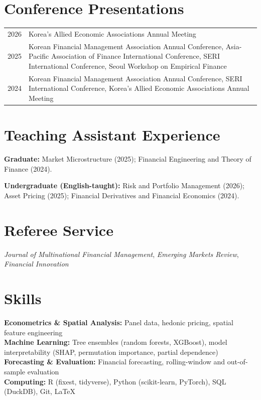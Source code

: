 \documentclass[11pt,a4paper]{article}
\begin{document}
\section{Conference Presentations}

\begin{tabularx}{\textwidth}{@{}p{1.1cm}X@{}}
2026 & Korea's Allied Economic Associations Annual Meeting \\
2025 & Korean Financial Management Association Annual Conference, Asia-Pacific Association of Finance International Conference, SERI International Conference, Seoul Workshop on Empirical Finance \\
2024 & Korean Financial Management Association Annual Conference, SERI International Conference, Korea's Allied Economic Associations Annual Meeting
\end{tabularx}

\section{Teaching Assistant Experience}

\textbf{Graduate:} Market Microstructure (2025); Financial Engineering and Theory of Finance (2024).

\textbf{Undergraduate (English-taught):} Risk and Portfolio Management (2026); Asset Pricing (2025); Financial Derivatives and Financial Economics (2024).

\section{Referee Service}

\textit{Journal of Multinational Financial Management}, \textit{Emerging Markets Review}, \textit{Financial Innovation}

\section{Skills}

\textbf{Econometrics \& Spatial Analysis:} Panel data, hedonic pricing, spatial feature engineering\\
\textbf{Machine Learning:} Tree ensembles (random forests, XGBoost), model interpretability (SHAP, permutation importance, partial dependence)\\
\textbf{Forecasting \& Evaluation:} Financial forecasting, rolling-window and out-of-sample evaluation\\
\textbf{Computing:} R (fixest, tidyverse), Python (scikit-learn, PyTorch), SQL (DuckDB), Git, \LaTeX
\end{document}
